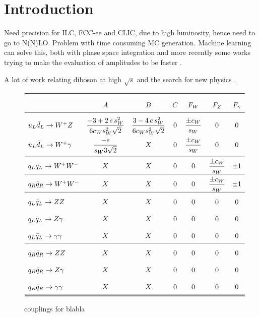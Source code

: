 \documentclass[aps,prl,twocolumn,superscriptaddress,amsfont,graphicx,preprintnumbers]{revtex4-1}
\newcommand{\red}[1]{{\color{Red}{#1}}}
\begin{document}
\maketitle
\section{Introduction}

Need precision for ILC, FCC-ee and CLIC, due to high luminosity, hence need to go to N(N)LO. Problem with time consuming MC generation. Machine learning can solve this, both with phase space integration \cite{} and more recently some works trying to make the evaluation of amplitudes to be faster \cite{Bishara:2019iwh,Badger:2020uow}. 
\medskip

A lot of work relating diboson at high $\sqrt{s}$ and the search for new physics
\cite{Falkowski:2015jaa,Butter:2016cvz,Azatov:2017kzw,Franceschini:2017xkh,Grojean:2018dqj,Bellazzini:2018paj,Biekotter:2018rhp,Banerjee:2018bio,Grojean:2018dqj, Baglio:2018bkm,Azatov:2019xxn, Brehmer:2019gmn,Liu:2019vid, Banerjee:2019pks,Banerjee:2019twi,Chiu:2019ksm,Baglio:2019uty, Bishara:2020vix, Baglio:2020oqu,Bishara:2020pfx,Bishara:2020vix}. \red{Motivate why we choose WZ from BSM most important channel}

\begin{figure}
\begin{equation}
\def\arraystretch{2}
\begin{array}{lcccccc}
\toprule
& A & B & C & F_W & F_Z & F_\gamma \\
\hline
&&&&&&\\[-0.7cm]
u_L \bar{d}_L \to W^+Z       & \dfrac{-3+2 \, e \, s_W^2}{6 c_W s_W^2 \sqrt{2}}& \dfrac{3-4 \, e \, s_W^2}{6 c_W s_W^2 \sqrt{2}} & 0 &   \dfrac{\pm c_W}{s_W}  & 0 & 0\\
u_L \bar{d}_L \to W^+\gamma  & \dfrac{-e}{s_W 3 \sqrt{2}}  & X & 0 &  \dfrac{\pm c_W}{s_W} & 0 & 0\\[0.2cm]
\hline
q_L \bar{q}_L \to W^+W^-             & X & X & 0 & 0 &  \dfrac{\pm c_W}{s_W}  & \pm 1\\
\hline
q_R \bar{q}_R \to W^+W^-             & X & X & 0 & 0 &  \dfrac{\pm c_W}{s_W}  & \pm 1\\
\hline
q_L \bar{q}_L \to ZZ & X & X & 0 & 0 & 0 & 0\\
q_L \bar{q}_L \to Z\gamma & X & X & 0 & 0 & 0 & 0\\
q_L \bar{q}_L \to \gamma\gamma & X & X & 0 & 0 & 0 & 0\\
\hline
q_R \bar{q}_R \to ZZ & X & X & 0 & 0 & 0 & 0\\
q_R \bar{q}_R \to Z\gamma & X & X & 0 & 0 & 0 & 0\\
q_R \bar{q}_R \to \gamma \gamma & X & X & 0 & 0 & 0 & 0\\
\hline
\bottomrule
\end{array}
\end{equation}
\caption{couplings for blabla}
\end{figure}
\end{document}
